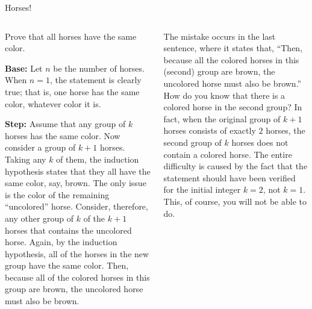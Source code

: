\documentclass[9pt,aspectratio=169,handout]{beamer}
\begin{document}
\begin{frame}{Horses!}
  \begin{columns}[T]
    \begin{column}{0.5\textwidth}
      \begin{problem}
        Prove that all horses have the same color.
      \end{problem}\pause
      \textbf{Base:} Let $n$ be the number of horses. When $n = 1$, the statement is clearly true; that is, one horse has the same color, whatever color it is. \pause
      
      \textbf{Step:} Assume that any group of $k$ horses has the same color. Now consider a group of $k + 1$ horses. Taking any $k$ of them, the induction hypothesis states that they all have the same color, say, brown. The only issue is the color of the remaining “uncolored” horse. Consider, therefore, any other group of $k$ of the $k+1$ horses that contains the uncolored horse. Again, by the induction hypothesis, all of the horses in the new group have the same color. Then, because all of the colored horses in this group are brown, the uncolored horse must also be brown.\pause
    \end{column}
    \begin{column}{0.5\textwidth}
      The mistake occurs in the last sentence, where it states that, “Then, because all the colored horses in this (second) group are brown, the uncolored horse must also be brown.” How do you know that there is a colored horse in the second group? In fact, when the original group of $k + 1$ horses consists of exactly $2$ horses, the second group of $k$ horses does not contain a colored horse. The entire difficulty is caused by the fact that the statement should have been verified for the initial integer $k = 2$, not $k = 1$. This, of course, you will not be able to do.
    \end{column}
  \end{columns}
\end{frame}
\end{document}

